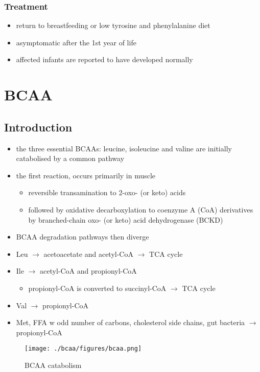 \documentclass{scrartcl}
\begin{document}
\subsubsection{Treatment}
\label{sec:orgcd89775}
\begin{itemize}
\item return to breastfeeding or low tyrosine and phenylalanine diet
\item asymptomatic after the 1st year of life
\item affected infants are reported to have developed normally
\end{itemize}

\section{BCAA}
\label{sec:org668725d}
\subsection{Introduction}
\label{sec:org41e3a03}
\begin{itemize}
\item the three essential BCAAs: leucine, isoleucine and valine are
initially catabolised by a common pathway
\item the first reaction, occurs primarily in muscle
\begin{itemize}
\item reversible transamination to 2-oxo- (or keto) acids
\item followed by oxidative decarboxylation to coenzyme A (CoA)
derivatives by branched-chain oxo- (or keto) acid dehydrogenase
(BCKD)
\end{itemize}
\item BCAA degradation pathways then diverge
\item Leu \(\to\) acetoacetate and acetyl-CoA \(\to\) TCA cycle
\item Ile \(\to\) acetyl-CoA and propionyl-CoA
\begin{itemize}
\item propionyl-CoA is converted to succinyl-CoA \(\to\) TCA cycle
\end{itemize}
\item Val \(\to\) propionyl-CoA
\item Met, FFA w odd number of carbons, cholesterol side chains, gut
bacteria \(\to\) propionyl-CoA
\end{itemize}

\begin{figure}[htbp]
\centering
\texttt{[image: ./bcaa/figures/bcaa.png]}
\caption{\label{fig:orgfd347c2}
BCAA catabolism}
\end{figure}
\end{document}
